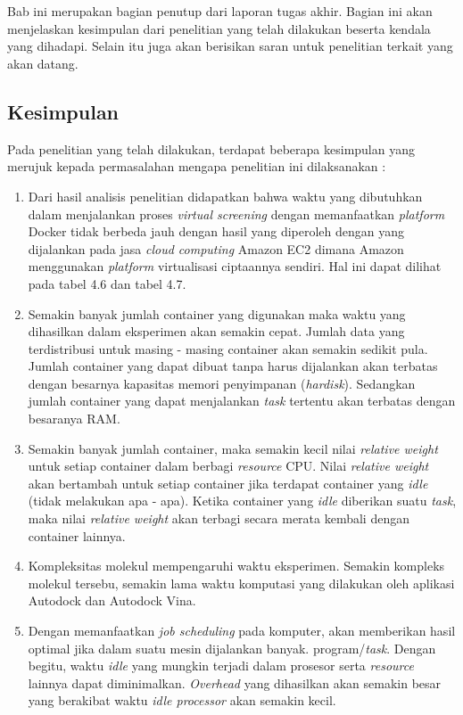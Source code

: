 \chapter{\kesimpulan}
Bab ini merupakan bagian penutup dari laporan tugas akhir. Bagian ini akan menjelaskan kesimpulan dari penelitian yang telah dilakukan beserta kendala yang dihadapi. Selain itu juga akan berisikan saran untuk penelitian terkait yang akan datang. 


\section{Kesimpulan}
Pada penelitian yang telah dilakukan, terdapat beberapa kesimpulan yang merujuk kepada permasalahan mengapa penelitian ini dilaksanakan :
\begin{enumerate}
	\item Dari hasil analisis penelitian didapatkan bahwa waktu yang dibutuhkan dalam menjalankan proses \textit{virtual screening} dengan memanfaatkan \textit{platform} Docker tidak berbeda jauh dengan hasil yang diperoleh dengan yang dijalankan pada jasa \textit{cloud computing} Amazon EC2 dimana Amazon menggunakan \textit{platform} virtualisasi ciptaannya sendiri. Hal ini dapat dilihat pada tabel 4.6 dan tabel 4.7.
	\item Semakin banyak jumlah container yang digunakan maka waktu yang dihasilkan dalam eksperimen akan semakin cepat. Jumlah data yang terdistribusi untuk masing - masing container akan semakin sedikit pula. Jumlah container yang dapat dibuat tanpa harus dijalankan akan terbatas dengan besarnya kapasitas memori penyimpanan (\textit{hardisk}). Sedangkan jumlah container yang dapat menjalankan \textit{task} tertentu akan terbatas dengan besaranya RAM. 
	\item Semakin banyak jumlah container, maka semakin kecil nilai \textit{relative weight} untuk setiap container dalam berbagi \textit{resource} CPU. Nilai \textit{relative weight} akan bertambah untuk setiap container jika terdapat container yang \textit{idle} (tidak melakukan apa - apa). Ketika container yang \textit{idle} diberikan suatu \textit{task}, maka nilai \textit{relative weight} akan terbagi secara merata kembali dengan container lainnya.
	\item Kompleksitas molekul mempengaruhi waktu eksperimen. Semakin kompleks molekul tersebu, semakin lama waktu komputasi yang dilakukan oleh aplikasi Autodock dan Autodock Vina.
	\item Dengan memanfaatkan \textit{job scheduling} pada komputer, akan memberikan hasil optimal jika dalam suatu mesin dijalankan banyak. program/\textit{task}. Dengan begitu, waktu \textit{idle} yang mungkin terjadi dalam prosesor serta \textit{resource} lainnya dapat diminimalkan. \textit{Overhead} yang dihasilkan akan semakin besar yang berakibat waktu \textit{idle processor} akan semakin kecil. 
\end{enumerate}

